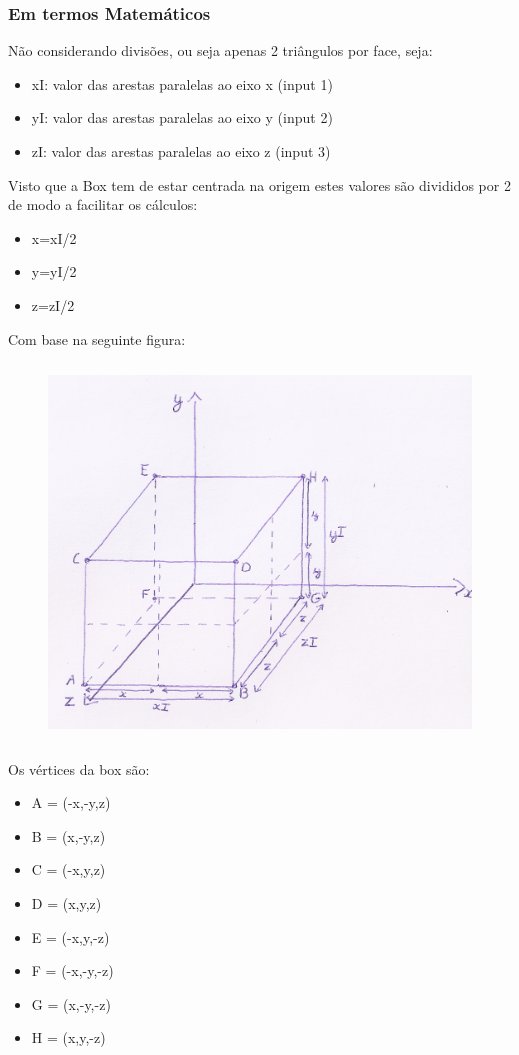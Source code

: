 \documentclass{article}
\begin{document}
\subsubsection{Em termos Matemáticos}
Não considerando divisões, ou seja apenas 2 triângulos por face, seja:
\begin{itemize}
    \item xI: valor das arestas paralelas ao eixo x (input 1)
    \item yI: valor das arestas paralelas ao eixo y (input 2)
    \item zI: valor das arestas paralelas ao eixo z (input 3)
\end{itemize}
Visto que a Box tem de estar centrada na origem estes valores são divididos por 2 de modo a facilitar os cálculos:
\begin{itemize}
    \item x=xI/2
    \item y=yI/2
    \item z=zI/2
\end{itemize}
Com base na seguinte figura:
\begin{figure}[H]
    \centering
    \includegraphics[height=10cm]{boxMath1.png}
\end{figure}
Os vértices da box são:
\begin{itemize}
    \item A = (-x,-y,z)
    \item B = (x,-y,z)
    \item C = (-x,y,z)
    \item D = (x,y,z)
    \item E = (-x,y,-z)
    \item F = (-x,-y,-z)
    \item G = (x,-y,-z)
    \item H = (x,y,-z)
\end{itemize}
\end{document}

